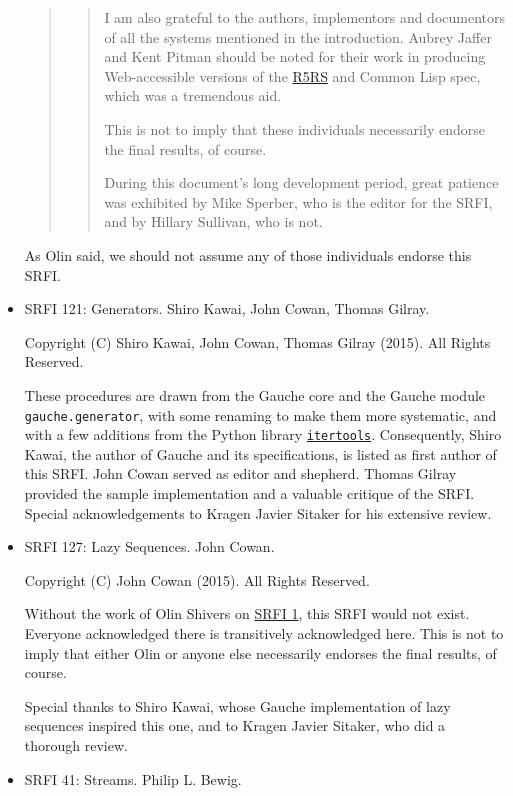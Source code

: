\begin{itemize}
\begin{quote}
\begin{quote}
I am also grateful to the authors, implementors and documentors of all
the systems mentioned in the introduction. Aubrey Jaffer and Kent Pitman
should be noted for their work in producing Web-accessible versions of
the \protect\hyperlink{R5RS}{R5RS} and Common Lisp spec, which was a
tremendous aid.

This is not to imply that these individuals necessarily endorse the
final results, of course.

During this document's long development period, great patience was
exhibited by Mike Sperber, who is the editor for the SRFI, and by
Hillary Sullivan, who is not.
\end{quote}
\end{quote}

As Olin said, we should not assume any of those individuals endorse this
SRFI.

\item SRFI 121: Generators. Shiro Kawai, John Cowan, Thomas Gilray.

Copyright (C) Shiro Kawai, John Cowan, Thomas Gilray (2015). All Rights
Reserved.

These procedures are drawn from the Gauche core and the Gauche module
\texttt{gauche.generator}, with some renaming to make them more
systematic, and with a few additions from the Python library
\href{https://docs.python.org/3/library/itertools.html}{\texttt{itertools}}.
Consequently, Shiro Kawai, the author of Gauche and its specifications,
is listed as first author of this SRFI. John Cowan served as editor and
shepherd. Thomas Gilray provided the sample implementation and a
valuable critique of the SRFI. Special acknowledgements to Kragen Javier
Sitaker for his extensive review.

\item SRFI 127: Lazy Sequences. John Cowan.

Copyright (C) John Cowan (2015). All Rights Reserved.

Without the work of Olin Shivers on
\href{http://srfi.schemers.org/srfi-1/srfi-1.html}{SRFI 1}, this SRFI
would not exist. Everyone acknowledged there is transitively
acknowledged here. This is not to imply that either Olin or anyone else
necessarily endorses the final results, of course.

Special thanks to Shiro Kawai, whose Gauche implementation of lazy
sequences inspired this one, and to Kragen Javier Sitaker, who did a
thorough review.

\item SRFI 41: Streams. Philip L. Bewig.


\end{itemize}
